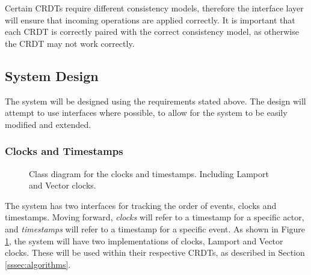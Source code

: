 \documentclass[12pt]{article}
\begin{document}
Certain CRDTs require different consistency models, therefore the interface layer will ensure that incoming operations are applied correctly. It is important that each CRDT is correctly paired with the correct consistency model, as otherwise the CRDT may not work correctly. \par

\subsection{System Design}
The system will be designed using the requirements stated above. The design will attempt to use interfaces where possible, to allow for the system to be easily modified and extended. 

\subsubsection{Clocks and Timestamps}

\begin{figure}[h]
    \centering
    \caption{Class diagram for the clocks and timestamps. Including Lamport and Vector clocks.}
    \label{fig:ordered}
\end{figure}

The system has two interfaces for tracking the order of events, clocks and timestamps. Moving forward, \textit{clocks} will refer to a timestamp for a specific actor, and \textit{timestamps} will refer to a timestamp for a specific event.  
As shown in Figure \ref{fig:ordered}, the system will have two implementations of clocks, Lamport and Vector clocks. These will be used within their respective CRDTs, as described in Section \ref{sssec:algorithms}. \par
\end{document}
